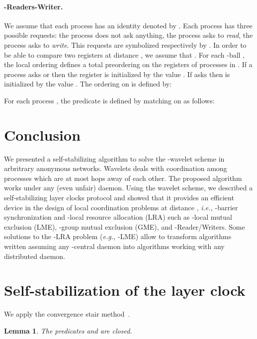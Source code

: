 \documentclass[11pt]{article}
\newtheorem{lemma}[theorem]{Lemma}
\newcommand{\eg}{\emph{e.g., }}
\newcommand{\ie}{\emph{i.e., }}
\begin{document}
\paragraph{-Readers-Writer.}

We assume that each process has an identity denoted by . Each process has three possible requests: the process does not ask
anything, the process asks to \emph{read}, the
process asks to \emph{write}. This requests are
symbolized respectively by . In order to be able
to compare two registers  at distance , we assume that . For each -ball , the local ordering 
defines a total preordering on the registers  of processes in . 
If a process  asks  or  then the register  is initialized by
the value . If  asks   then  is initialized
by the value .  
The ordering  on  is defined by:




For each process , the predicate  is defined by matching on  as follows: 






\section{Conclusion}
\label{sec:conclusion}
We presented a self-stabilizing algorithm to solve the -wavelet scheme in arbritrary anonymous networks. 
Wavelets deals with coordination among processes which are at most  hops away of each other.  
The proposed algorithm works under any (even unfair) daemon. 
Using the wavelet scheme, we described a self-stabilizing layer clocks protocol and 
showed that it provides an efficient device in the design of local coordination 
problems at distance , \ie -barrier synchronization and
-local resource allocation (LRA) such as -local mutual exclusion (LME), 
-group mutual exclusion (GME), and -Reader/Writers.  Some solutions to 
the -LRA problem (\eg -LME) allow 
to transform algorithms written assuming any -central daemon into algorithms working 
with any distributed daemon.  

\singlespacing



\begin{small}

\end{small}

\newpage

\appendix

\section{Self-stabilization of the layer clock}
We apply the convergence stair method~\cite{D00}.\begin{lemma}
The predicates  and  are closed.
\end{lemma}
\end{document}

